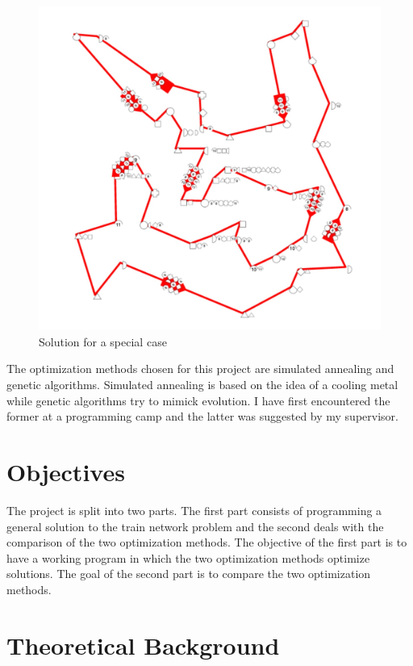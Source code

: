 \documentclass[10pt]{scrreprt}
\begin{document}
\begin{figure}[h]
    \centering
    \includegraphics[scale=0.2]{pictures/sub2.jpeg}
    \caption{Solution for a special case}
    \label{}
\end{figure}

The optimization methods chosen for this project are simulated annealing and genetic algorithms. Simulated annealing is based on the idea of a cooling metal while genetic algorithms try to mimick evolution. I have first encountered the former at a programming camp and the latter was suggested by my supervisor.

\chapter{Objectives}

The project is split into two parts. The first part consists of programming a general solution to the train network problem and the second deals with the comparison of the two optimization methods. The objective of the first part is to have a working program in which the two optimization methods optimize solutions. The goal of the second part is to compare the two optimization methods.


\chapter{Theoretical Background}
\end{document}
